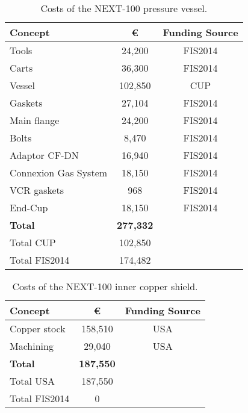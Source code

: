 \begin{table}[h!]
\begin{center}
\begin{tabular}{|l|c|c|}
\hline
 Concept & \euro & Funding Source \\
 \hline
Tools &	24,200 & FIS2014 \\
Carts &	 36,300 & FIS2014 \\
Vessel	& 102,850 & CUP \\
Gaskets 	& 27,104 & FIS2014 \\
Main flange &	24,200 & FIS2014 \\
Bolts & 8,470 & FIS2014 \\
Adaptor CF-DN	 &	16,940 & FIS2014 \\
Connexion Gas System	& 18,150 & FIS2014 \\ 
VCR gaskets	& 968 & FIS2014 \\ 
End-Cup & 18,150 & FIS2014 \\ 
\hline
{\bf Total}	& {\bf277,332 } & \\	
Total CUP	& 102,850 & \\	
Total FIS2014	& 174,482 & \\	
 \hline\hline
\end{tabular}  
\caption{Costs of the NEXT-100 pressure vessel.}
\label{tab.n100:PV}
\end{center}
\end{table} 

\begin{table}[h!]
\begin{center}
\begin{tabular}{|l|c|c|}
\hline
 Concept & \euro & Funding Source \\
 \hline
 Copper stock &	158,510 &	USA \\
Machining & 29,040 &	USA \\
 \hline
{\bf Total} &	{\bf 187,550} & \\		
Total USA	& 187,550 & \\
Total FIS2014	& 0 & \\	
 \hline\hline
\end{tabular}  
\caption{Costs of the NEXT-100 inner copper shield.}
\label{tab.n100:ICS}
\end{center}
\end{table} 

